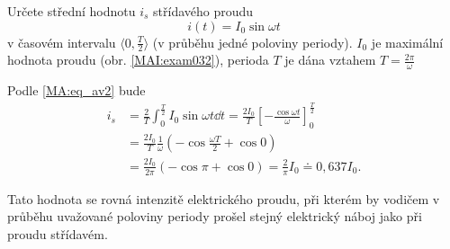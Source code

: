 \begin{mdframed}[style=mdexam]
  \begin{example}\label{MAI:exam032}
    Určete střední hodnotu $i_s$ střídavého proudu $$i(t) = I_0\sin\omega t$$ v časovém intervalu
    $\langle 0, \frac{T}{2}\rangle$ (v průběhu jedné poloviny periody). $I_0$ je maximální hodnota
    proudu (obr. \ref{MAI:exam032}), perioda $T$ je dána vztahem $T = \frac{2\pi}{\omega}$
    
    {\centering
    \captionsetup{type=figure}
    \par}

      Podle \ref{MA:eq_av2} bude
      \begin{align*}
      i_s &=  \frac{2}{T}
              \int_0^{\frac{T}{2}}I_0\sin\omega t\dd{t} =
              \frac{2I_0}{T}\left[-\frac{\cos\omega t}{\omega}\right]_0^{\frac{T}{2}}        \\
          &=  \frac{2I_0}{T}\frac{1}{\omega}\left(-\cos\frac{\omega T}{2}+ \cos 0\right)     \\
          &=  \frac{2I_0}{2\pi}(-\cos\pi + \cos 0) = \frac{2}{\pi}I_0 \doteq 0,637 I_0.
    \end{align*}

    Tato hodnota se rovná intenzitě elektrického proudu, při kterém by vodičem v průběhu uvažované
    poloviny periody prošel stejný elektrický náboj jako při proudu střídavém.
  \end{example}
\end{mdframed}















